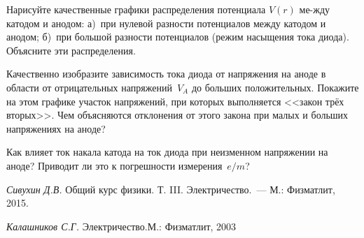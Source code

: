\begin{lab:questions}
	\item{Нарисуйте качественные графики распределения потенциала $V(r)$ ме-жду
катодом и анодом: а)~при нулевой разности потенциалов между катодом и анодом;
б)~при большой разности потенциалов (режим насыщения тока диода). Объясните эти
распределения.}

	\item{Качественно изобразите зависимость тока диода от напряжения на аноде в
области от отрицательных напряжений~$V_{A}$ до больших положительных. Покажите
на этом графике участок напряжений, при которых выполняется <<закон трёх
вторых>>. Чем объясняются отклонения от этого закона при малых и больших
напряжениях на аноде?}

	\item{ Как влияет ток накала катода на ток диода при неизменном напряжении
на аноде? Приводит ли это к погрешности измерения~$e/m$?}
\end{lab:questions}

\begin{lab:literature}
	\item{\emph{Сивухин Д.В.} Общий курс физики. Т. III. Электричество.~--- М.:
Физматлит, 2015}.
	\item{\emph{Калашников С.Г.} Электричество.М.: Физматлит, 2003}
\end{lab:literature}


